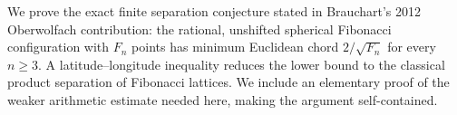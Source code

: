 We prove the exact finite separation conjecture stated in Brauchart's
2012 Oberwolfach contribution: the rational, unshifted spherical Fibonacci
configuration with $F_n$ points has minimum Euclidean chord $2/\sqrt{F_n}$
for every $n\geq3$. A latitude--longitude inequality reduces the lower
bound to the classical product separation of Fibonacci lattices. We
include an elementary proof of the weaker arithmetic estimate needed
here, making the argument self-contained.
